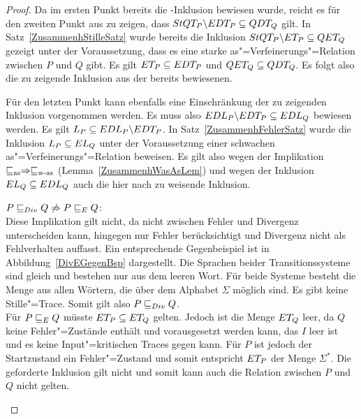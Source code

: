\begin{proof}
  Da im ersten Punkt bereits die \EDT{}-Inklusion bewiesen wurde, reicht es
  für den zweiten Punkt aus zu zeigen, dass $StQT _P\backslash EDT _P
  \subseteq QDT _Q$ gilt. In Satz~\ref{ZusammenhStilleSatz} wurde bereits die
  Inklusion $StQT _P \backslash ET _P \subseteq QET _Q$ gezeigt unter der
  Voraussetzung, dass es eine starke as"=Verfeinerungs"=Relation zwischen
  $P$ und $Q$ gibt. Es gilt $ET _P \subseteq EDT _P$ und $QET _Q \subseteq
  QDT _Q$. Es folgt also die zu zeigende Inklusion aus der bereits bewiesenen.

  Für den letzten Punkt kann ebenfalls eine Einschränkung der zu zeigenden
  Inklusion vorgenommen werden. Es muss also $EDL _P \backslash EDT _P
  \subseteq EDL _Q$ bewiesen werden. Es gilt $L _P \subseteq EDL _P
  \backslash EDT _P$. In Satz~\ref{ZusammenhFehlerSatz} wurde die Inklusion
  $L _P\subseteq EL _Q$ unter der Voraussetzung einer schwachen
  as"=Verfeinerungs"=Relation beweisen. Es gilt also wegen der Implikation
  $\sqsubseteq _{\mathrm{as}} \Rightarrow \sqsubseteq _{\mathrm{w}\text{-}\mathrm{as}}$ (Lemma~\ref{ZusammenhWasAsLem}) und wegen der
  Inklusion $EL _Q \subseteq EDL _Q$ auch die hier nach zu weisende
  Inklusion.

  $P  \sqsubseteq  _{Div} Q \not\Rightarrow P  \sqsubseteq  _E Q$:\\
  Diese Implikation gilt nicht, da \DRel{} nicht zwischen Fehler und Divergenz
  unterscheiden kann, \ERel{} hingegen nur Fehler berücksichtigt und Divergenz
  nicht als Fehlverhalten auffasst. Ein entsprechende Gegenbeispiel ist in
  Abbildung~\ref{DivEGegenBsp} dargestellt. Die Sprachen beider
  Transitionssysteme sind gleich und bestehen nur aus dem leeren Wort. Für
  beide Systeme besteht die Menge \EDT{} aus allen Wörtern, die über dem
  Alphabet $\Sigma$ möglich sind. Es gibt keine Stille"=Trace. Somit gilt also
  $P  \sqsubseteq  _{Div} Q$.\\
  Für $P  \sqsubseteq  _E Q$ müsste $ET _P \subseteq ET _Q$ gelten. Jedoch ist die Menge
  $ET _Q$ leer, da $Q$ keine Fehler"=Zustände enthält und vorausgesetzt werden
  kann, das $I$ leer ist und es keine Input"=kritischen Traces gegen kann. Für
  $P$ ist jedoch der Startzustand ein Fehler"=Zustand und somit entspricht $ET
  _P$ der Menge $\Sigma ^*$. Die geforderte Inklusion gilt nicht und somit
  kann auch die Relation \ERel{} zwischen $P$ und $Q$ nicht gelten.

  \begin{figure}[htbp]
    \begin{center}
\end{center}
\end{figure}
\end{proof}
